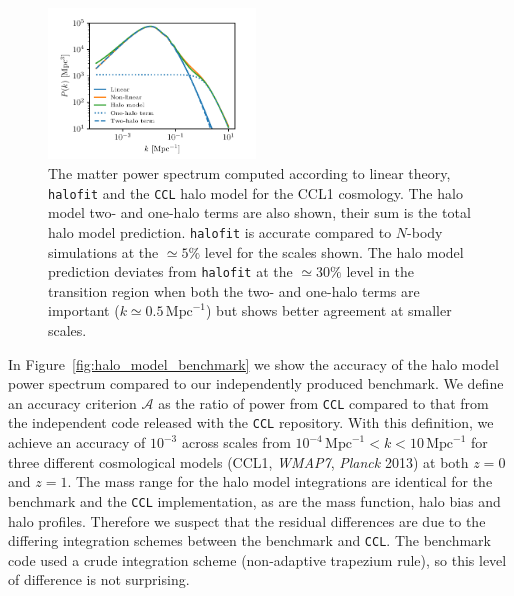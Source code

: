 \documentclass[\docopts]{\docclass}
\newcommand{\ccl}{{\tt CCL}\xspace}
\newcommand{\halofit}{{\tt halofit}\xspace}
\begin{document}
\begin{figure}
\includegraphics[width=0.49\textwidth]{halomodel}
\caption{The matter power spectrum computed according to linear theory, \halofit and the \ccl halo model for the CCL1 cosmology. The halo model two- and one-halo terms are also shown, their sum is the total halo model prediction. \halofit is accurate compared to $N$-body simulations at the $\simeq5\%$ level for the scales shown. The halo model prediction deviates from \halofit at the $\simeq30\%$ level in the transition region when both the two- and one-halo terms are important ($k\simeq0.5\,\mathrm{Mpc}^{-1}$) but shows better agreement at smaller scales.}
\label{fig:halo_model}
\end{figure}

In Figure~\ref{fig:halo_model_benchmark} we show the accuracy of the halo model power spectrum compared to our independently produced benchmark. We define an accuracy criterion $\mathcal{A}$ as the ratio of power from \ccl compared to that from the independent code released with the \ccl repository. With this definition, we achieve an accuracy of $10^{-3}$ across scales from $10^{-4}\,\mathrm{Mpc}^{-1}<k<10\,\mathrm{Mpc}^{-1}$ for three different cosmological models (CCL1, {\it WMAP7}, {\it Planck} 2013) at both $z=0$ and $z=1$. The mass range for the halo model integrations are identical for the benchmark and the \ccl implementation, as are the mass function, halo bias and halo profiles. Therefore we suspect that the residual differences are due to the differing integration schemes between the benchmark and \ccl. The benchmark code used a crude integration scheme (non-adaptive trapezium rule), so this level of difference is not surprising.
\end{document}
